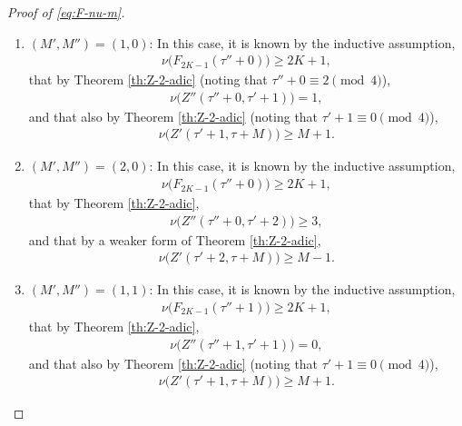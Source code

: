 \documentclass[10pt,a4paper]{amsart}
\begin{document}
\begin{proof}[Proof of \eqref{eq:F-nu-m}]
\begin{enumerate}[label={\textbf{(\alph*).}},leftmargin=*,labelsep=0cm,align=left]
		\item $(M',M'')=(1,0)$: In this case, it is known by the inductive assumption,
		\begin{align*}
			\nu\big(F_{2K-1}(\tau'' + 0)\big) \ge 2K + 1,
		\end{align*}
		that by Theorem \ref{th:Z-2-adic} (noting that $\tau''+0\equiv 2 \pmod{4}$),
		\begin{align*}
			\nu\big(Z''(\tau'' + 0,\tau'+1)\big) = 1,
		\end{align*}
		and that also by Theorem \ref{th:Z-2-adic} (noting that $\tau'+1\equiv 0\pmod{4}$),
		\begin{align*}
			\nu\big(Z'(\tau' + 1,\tau+M)\big) \ge M+1.
		\end{align*}
	
		\item $(M',M'')=(2,0)$: In this case, it is known by the inductive assumption,
		\begin{align*}
			\nu\big(F_{2K-1}(\tau'' + 0)\big) \ge 2K + 1,
		\end{align*}
		that by Theorem \ref{th:Z-2-adic},
		\begin{align*}
			\nu\big(Z''(\tau'' + 0,\tau'+2)\big) \ge 3,
		\end{align*}
		and that by a weaker form of Theorem \ref{th:Z-2-adic},
		\begin{align*}
			\nu\big(Z'(\tau' + 2,\tau+M)\big) \ge M-1.
		\end{align*}
	
		\item $(M',M'')=(1,1)$: In this case, it is known by the inductive assumption,
		\begin{align*}
			\nu\big(F_{2K-1}(\tau'' + 1)\big) \ge 2K + 1,
		\end{align*}
		that by Theorem \ref{th:Z-2-adic},
		\begin{align*}
			\nu\big(Z''(\tau'' + 1,\tau'+1)\big) = 0,
		\end{align*}
		and that also by Theorem \ref{th:Z-2-adic} (noting that $\tau'+1\equiv 0\pmod{4}$),
		\begin{align*}
			\nu\big(Z'(\tau' + 1,\tau+M)\big) \ge M+1.
		\end{align*}
	

\end{enumerate}
\end{proof}
\end{document}
